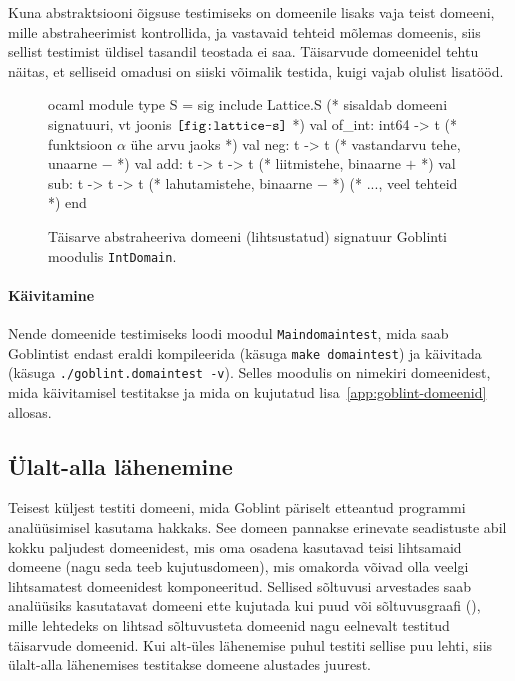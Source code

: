 \documentclass[../thesis.tex]{subfiles}
\begin{document}
Kuna abstraktsiooni õigsuse testimiseks on domeenile lisaks vaja teist domeeni, mille abstraheerimist kontrollida, ja vastavaid tehteid mõlemas domeenis, siis sellist testimist üldisel tasandil teostada ei saa. Täisarvude domeenidel tehtu näitas, et selliseid omadusi on siiski võimalik testida, kuigi vajab olulist lisatööd.

\begin{figure}
	\centering
	\begin{bminted}[mathescape]{ocaml}
		module type S =
		sig
		  include Lattice.S (* sisaldab domeeni signatuuri, vt joonis $\texttt{\ref{fig:lattice-s}}$ *)
		  val of_int: int64 -> t (* funktsioon $\alpha$ ühe arvu jaoks *)
		  val neg: t -> t (* vastandarvu tehe, unaarne $-$ *)
		  val add: t -> t -> t (* liitmistehe, binaarne $+$ *)
		  val sub: t -> t -> t (* lahutamistehe, binaarne $-$ *)
		  (* ..., veel tehteid *)
		end
	\end{bminted}
	\caption{Täisarve abstraheeriva domeeni (lihtsustatud) signatuur Goblinti moodulis \texttt{IntDomain}.}
	\label{fig:intdomain-s}
\end{figure}

\paragraph{Käivitamine}
Nende domeenide testimiseks loodi moodul \texttt{Maindomaintest}, mida saab Goblintist endast eraldi kompileerida (käsuga \texttt{make domaintest}) ja käivitada (käsuga \texttt{./goblint.domaintest -v}). Selles moodulis on nimekiri domeenidest, mida käivitamisel testitakse ja mida on kujutatud lisa~\ref{app:goblint-domeenid} allosas.

\subsection{Ülalt-alla lähenemine}
Teisest küljest testiti domeeni, mida Goblint päriselt etteantud programmi analüüsimisel kasutama hakkaks. See domeen pannakse erinevate seadistuste abil kokku paljudest domeenidest, mis oma osadena kasutavad teisi lihtsamaid domeene (nagu seda teeb kujutusdomeen), mis omakorda võivad olla veelgi lihtsamatest domeenidest komponeeritud. Sellised sõltuvusi arvestades saab analüüsiks kasutatavat domeeni ette kujutada kui puud või sõltuvusgraafi (), mille lehtedeks on lihtsad sõltuvusteta domeenid nagu eelnevalt testitud täisarvude domeenid. Kui alt-üles lähenemise puhul testiti sellise puu lehti, siis ülalt-alla lähenemises testitakse domeene alustades juurest.
\end{document}
